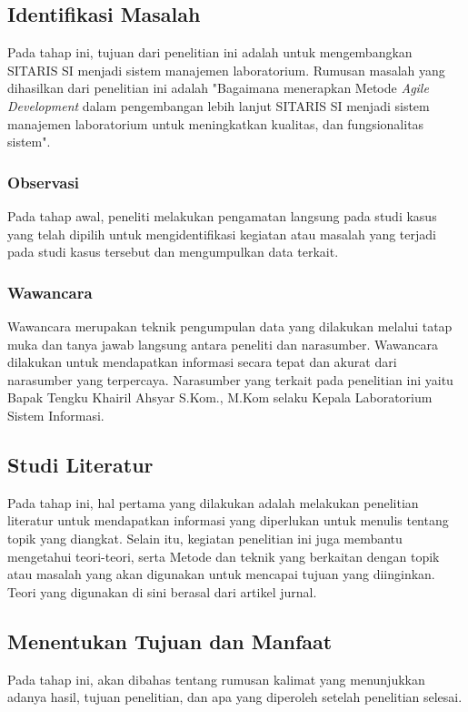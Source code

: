 \subsection{Identifikasi Masalah}
Pada tahap ini, tujuan dari penelitian ini adalah untuk mengembangkan SITARIS SI menjadi sistem manajemen laboratorium. Rumusan masalah yang dihasilkan dari penelitian ini adalah "Bagaimana menerapkan Metode \textit{Agile Development} dalam pengembangan lebih lanjut SITARIS SI menjadi sistem manajemen laboratorium untuk meningkatkan kualitas, dan fungsionalitas sistem".

\subsubsection{Observasi}
Pada tahap awal, peneliti melakukan pengamatan langsung pada studi kasus yang telah dipilih untuk mengidentifikasi kegiatan atau masalah yang terjadi pada studi kasus tersebut dan mengumpulkan data terkait.

\subsubsection{Wawancara}
Wawancara merupakan teknik pengumpulan data yang dilakukan melalui tatap muka dan tanya jawab langsung antara peneliti dan narasumber. Wawancara dilakukan untuk mendapatkan informasi secara tepat dan akurat dari narasumber yang terpercaya. Narasumber yang terkait pada penelitian ini yaitu Bapak Tengku Khairil Ahsyar S.Kom., M.Kom selaku Kepala Laboratorium Sistem Informasi.

\subsection{Studi Literatur}
Pada tahap ini, hal pertama yang dilakukan adalah melakukan penelitian literatur untuk mendapatkan informasi yang diperlukan untuk menulis tentang topik yang diangkat. Selain itu, kegiatan penelitian ini juga membantu mengetahui teori-teori, serta Metode dan teknik yang berkaitan dengan topik atau masalah yang akan digunakan untuk mencapai tujuan yang diinginkan. Teori yang digunakan di sini berasal dari artikel jurnal.

\subsection{Menentukan Tujuan dan Manfaat}
Pada tahap ini, akan dibahas tentang rumusan kalimat yang menunjukkan adanya hasil, tujuan penelitian, dan apa yang diperoleh setelah penelitian selesai.


